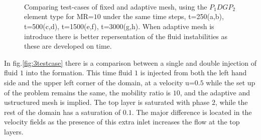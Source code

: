 \documentclass[preprint,authoryear,12pt]{elsarticle}
\begin{document}
\begin{figure}[h]
\begin{center}
{}%
\\ 
\\
\\
\end{center}
\caption{Comparing test-cases of fixed and adaptive mesh, using the $P_{1}DGP_{2}$ element type for MR=$10$ under the same time steps, t=250(a,b), t=500(c,d), t=1500(e,f), t=3000(g,h). When adaptive mesh is introduce there is better repersentation of the fluid instabilities as these are developed on time. }
\label{fig:2testcase}
\end{figure}

In fig.\ref{fig:3testcase} there is a comparison between a single and double injection of fluid $1$ into the formation. This time fluid $1$ is injected from both the left hand side and the upper left corner of the domain, at a velocity u=$0.5$ while the set up of the problem remains the same, the mobility ratio is $10$, and the adaptive and ustructured mesh is implied. The top layer is saturated with phase $2$, while the rest of the domain has a saturation of $0.1$. The major difference is located in the velocity fields as the presence of this extra inlet increases the flow at the top layers.
\end{document}
